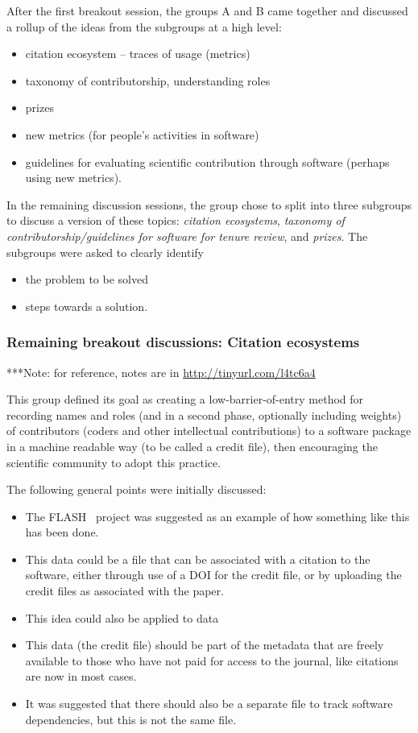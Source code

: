 \documentclass[11pt, oneside]{amsart}
\newcommand{\note}[1]{ {\textcolor{blueish}    { ***Note:      #1 }}}
\begin{document}
After the first breakout session, the groups A and B came together and discussed
a rollup of the ideas from the subgroups at a high level:
\begin{itemize}
\item citation ecosystem -- traces of usage (metrics)
\item taxonomy of contributorship, understanding roles
\item prizes
\item new metrics (for people's activities in software)
\item guidelines for evaluating scientific contribution through software (perhaps
using new metrics).
\end{itemize}

In the remaining discussion sessions, the group chose to split into three
subgroups to discuss a version of these topics: {\em citation ecosystems}, {\em
taxonomy of contributorship/guidelines for software for tenure review}, and {\em
prizes}. The subgroups were asked to clearly identify
\begin{itemize}
\item the problem to be solved
\item steps towards a solution.
\end{itemize}



\subsubsection{Remaining breakout discussions: Citation ecosystems}

\note{for reference, notes are in \url{http://tinyurl.com/l4tc6a4}}

This group defined its goal as creating a low-barrier-of-entry method for
recording names and roles (and in a second phase, optionally including weights)
of contributors (coders and other intellectual contributions) to a software
package in a machine readable way (to be called a credit file), then encouraging
the scientific community to adopt this practice.

The following general points were initially discussed:
\begin{itemize}
\item The FLASH~\cite{flash} project was suggested as an example of how something
like this has been done.
\item This data could be a file that can be associated with a citation to the
software, either through use of a DOI for the credit file, or by uploading the
credit files as associated with the paper.
\item This idea could also be applied to data
\item This data (the credit file) should be part of the metadata that are freely
available to those who have not paid for access to the journal, like citations
are now in most cases.
\item It was suggested that there should also be a separate file to track
software dependencies, but this is not the same file.
\end{itemize}
\end{document}

